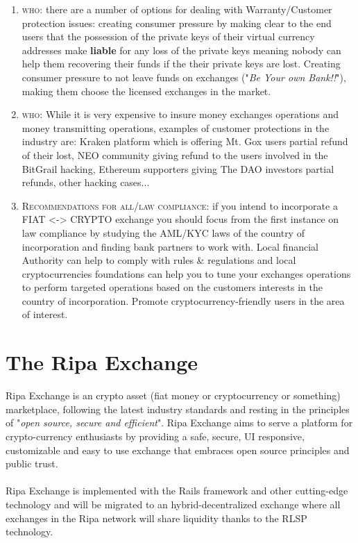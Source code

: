 \documentclass[11pt,fleqn,oneside]{book} %
\begin{document}
\begin{enumerate}
	\item \textsc{who}: there are a number of options for dealing with Warranty/Customer protection issues: 
	creating consumer pressure by making clear to the end users that the possession of the private keys of their
	virtual currency addresses make \textbf{liable} for any loss of the private keys meaning nobody can help
	them recovering their funds if the their private keys are lost. Creating consumer pressure to not leave funds
	on exchanges ("\textit{Be Your own Bank!!}"), making them choose the licensed exchanges in the market. 
	\item \textsc{who}: While it is very expensive to insure money exchanges operations and money transmitting operations, 
	examples of customer protections in the industry are: Kraken platform which is offering Mt. Gox users partial refund
	of their lost, NEO community giving refund to the users involved in the BitGrail hacking, Ethereum supporters
	giving The DAO investors partial refunds, other hacking cases...

	\item \textsc{Recommendations for all/law compliance}: if you intend to incorporate a FIAT <-> CRYPTO exchange you should
	focus from the first instance on law compliance by studying the AML/KYC laws of the country of incorporation and
	finding bank partners to work with. Local financial Authority can help to comply with rules \& regulations and 
	local cryptocurrencies foundations can help you to tune your exchanges operations to perform targeted
	operations based on the customers interests in the country of incorporation.
	Promote cryptocurrency-friendly users in the area of interest.
\end{enumerate}




\chapter{The Ripa Exchange}
Ripa Exchange is an crypto asset (fiat money or cryptocurrency or something) marketplace, following the latest 
industry standards and resting in the principles of "\textit{open source, secure and efficient}". Ripa Exchange
aims to serve a platform for crypto-currency enthusiasts by providing a safe, secure, UI responsive, customizable 
and easy to use exchange that embraces open source principles and public trust.\\\\
Ripa Exchange is implemented with the Rails framework and other cutting-edge technology and will be migrated to an
hybrid-decentralized exchange where all exchanges in the Ripa network will share liquidity thanks to the RLSP technology.
\end{document}

